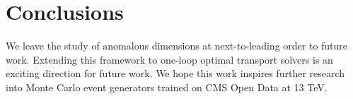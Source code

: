 \section{Conclusions}\label{sec:conclusions}

We leave the study of anomalous dimensions at next-to-leading order to
future work. Extending this framework to one-loop optimal transport
solvers is an exciting direction for future work. We hope this work
inspires further research into Monte Carlo event generators trained on
CMS Open Data at 13 TeV.


